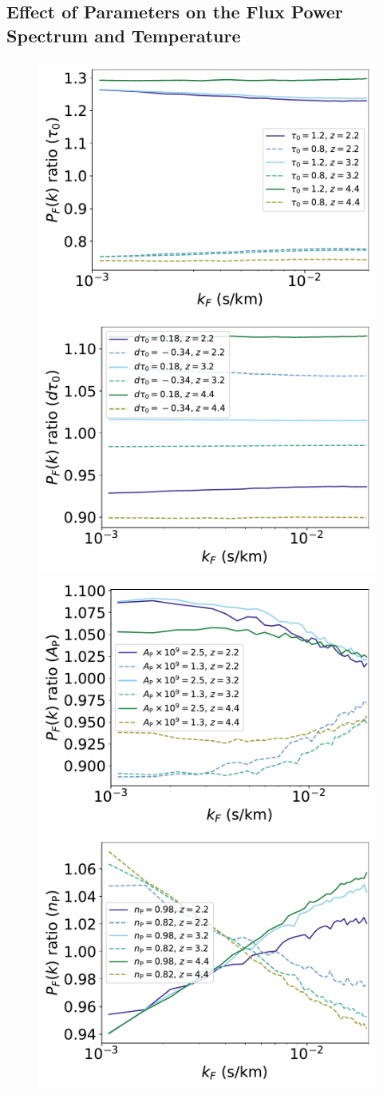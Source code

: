 \documentclass[a4paper,11pt]{article}
\begin{document}


\subsection{Effect of Parameters on the Flux Power Spectrum and Temperature}
\label{sec:singleparams}

\begin{figure}
    \centering
    \includegraphics[width=0.48\columnwidth]{figures/single_param_tau0.pdf}
    \includegraphics[width=0.48\columnwidth]{figures/single_param_dtau0.pdf}
	\includegraphics[width=0.48\columnwidth]{figures/single_param_Ap.pdf}
		\includegraphics[width=0.48\columnwidth]{figures/single_param_ns.pdf} \\

\end{figure}
\end{document}
